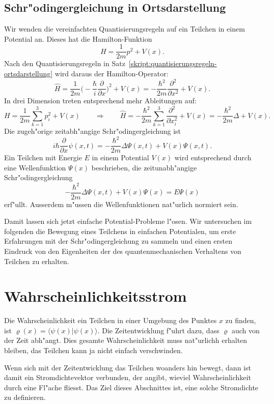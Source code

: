 \subsection{Schr"odingergleichung in Ortsdarstellung}
Wir wenden die vereinfachten Quantisierungsregeln auf ein
Teilchen in einem Potential an.
Dieses hat die Hamilton-Funktion
\[
H=\frac1{2m}p^2+V(x).
\]
Nach den Quantisierungsregeln in
Satz~\ref{skript:quantisierungsregeln-ortsdarstellung} wird daraus
der Hamilton-Operator:
\[
\hat H
=
\frac{1}{2m}\biggl(-\frac{\hbar}{i}\frac{\partial }{\partial x}\biggr)^2
+V(x)
=
-\frac{\hbar^2}{2m}\frac{\partial^2}{\partial x^2}+V(x).
\]
In drei Dimension treten entsprechend mehr Ableitungen auf:
\[
H=\frac1{2m}\sum_{k=1}^3p_i^2+V(x)
\qquad\Rightarrow\qquad
\hat H
=
-\frac{\hbar^2}{2m}\sum_{k=1}^3\frac{\partial^2}{\partial x_i^2}+V(x)
=
-\frac{\hbar^2}{2m}\Delta + V(x).
\]
Die zugeh"orige zeitabh"angige Schr"odingergleichung ist
\[
i\hbar\frac{\partial}{\partial x}\psi(x,t)
=
-\frac{\hbar^2}{2m}\Delta\Psi(x,t) + V(x)\Psi(x,t).
\]
Ein Teilchen mit Energie $E$ in einem Potential $V(x)$ wird entsprechend
durch eine Wellenfunktion $\Psi(x)$ beschrieben, die zeitunabh"angige
Schr"odingergleichung
\[
-\frac{\hbar^2}{2m}\Delta\Psi(x,t) + V(x)\Psi(x)
=
E\Psi(x)
\]
erf"ullt.
Ausserdem m"ussen die Wellenfunktionen nat"urlich normiert sein.

Damit lassen sich jetzt einfache Potential-Probleme l"osen.
Wir untersuchen im folgenden die Bewegung eines Teilchens in einfachen
Potentialen, um erste Erfahrungen mit der Schr"odingergleichung
zu sammeln und einen ersten Eindruck von den Eigenheiten der
des quantenmechanischen Verhaltens von Teilchen zu erhalten.




\section{Wahrscheinlichkeitsstrom}
Die Wahrscheinlichkeit ein Teilchen in einer Umgebung des
Punktes $x$ zu finden, ist $\varrho(x)=\langle \psi(x)|\psi(x)\rangle$.
Die Zeitentwicklung f"uhrt dazu, dass $\varrho$ auch von der
Zeit abh"angt.
Dies gesamte Wahrscheinlichkeit muss nat"urlichh erhalten bleiben,
das Teilchen kann ja nicht einfach verschwinden.

Wenn sich mit der Zeitentwicklung das Teilchen woanders hin bewegt,
dann ist damit ein Stromdichtevektor verbunden, der angibt, 
wieviel Wahrscheinlichkeit durch eine Fl"ache fliesst.
Das Ziel dieses Abschnittes ist, eine solche Stromdichte zu
definieren.

